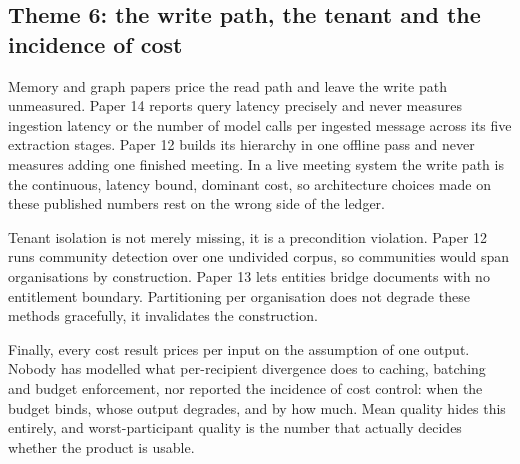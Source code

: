 \subsection{Theme 6: the write path, the tenant and the incidence of cost}

Memory and graph papers price the read path and leave the write path
unmeasured. Paper 14 reports query latency precisely and never measures
ingestion latency or the number of model calls per ingested message across its
five extraction stages. Paper 12 builds its hierarchy in one offline pass and
never measures adding one finished meeting. In a live meeting system the write
path is the continuous, latency bound, dominant cost, so architecture choices
made on these published numbers rest on the wrong side of the ledger.

Tenant isolation is not merely missing, it is a precondition violation. Paper
12 runs community detection over one undivided corpus, so communities would
span organisations by construction. Paper 13 lets entities bridge documents
with no entitlement boundary. Partitioning per organisation does not degrade
these methods gracefully, it invalidates the construction.

Finally, every cost result prices per input on the assumption of one output.
Nobody has modelled what per-recipient divergence does to caching, batching and
budget enforcement, nor reported the incidence of cost control: when the budget
binds, whose output degrades, and by how much. Mean quality hides this
entirely, and worst-participant quality is the number that actually decides
whether the product is usable.

